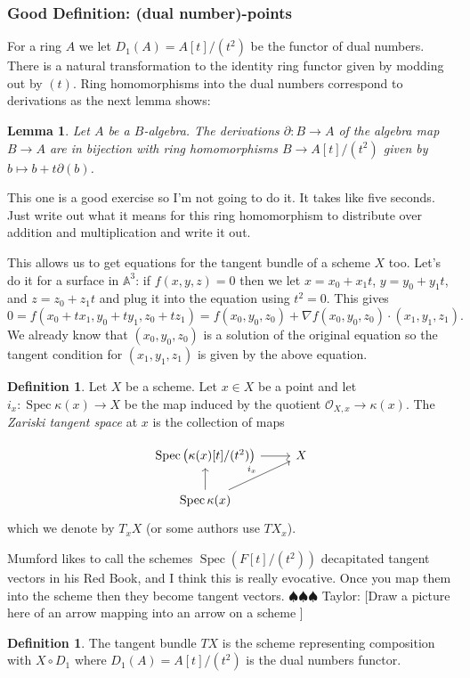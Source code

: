\documentclass[12pt]{article}
\numberwithin{equation}{section}
\newtheorem{lemma}[theorem]{Lemma}
\theoremstyle{definition}
\newtheorem{definition}[theorem]{Definition}
\theoremstyle{remark}
\newcommand{\Ocal}{\mathcal{O}}
\renewcommand{\AA}{\mathbb{A}}
\newcommand{\Spec}{\operatorname{Spec}}
\newcommand{\taylor}[1]{{\color{blue} \sf $\spadesuit\spadesuit\spadesuit$ Taylor: [#1]}}
\begin{document}
\subsubsection{Good Definition: (dual number)-points}
For a ring $A$ we let $D_1(A) = A[t]/(t^2)$ be the functor of dual numbers. 
There is a natural transformation to the identity ring functor given by modding out by $(t)$. 
Ring homomorphisms into the dual numbers correspond to derivations as the next lemma shows:
\begin{lemma}
	Let $A$ be a $B$-algebra. 
	The derivations $\partial: B \to A$ of the algebra map $B \to A$ are in bijection with ring homomorphisms $B\to A[t]/(t^2)$ given by $b\mapsto b + t\partial(b)$.  
\end{lemma}
This one is a good exercise so I'm not going to do it. 
It takes like five seconds. 
Just write out what it means for this ring homomorphism to distribute over addition and multiplication and write it out.

This allows us to get equations for the tangent bundle of a scheme $X$ too. 
Let's do it for a surface in $\AA^3$: if $f(x,y,z)=0$ then we let $x=x_0+x_1t$, $y=y_0+y_1t$, and $z=z_0+z_1 t$ and plug it into the equation using $t^2=0$. 
This gives
$$ 0=f(x_0+tx_1,y_0+ty_1,z_0+tz_1) = f(x_0,y_0,z_0) + \nabla f(x_0,y_0,z_0) \cdot (x_1,y_1,z_1).$$
We already know that $(x_0,y_0,z_0)$ is a solution of the original equation so the tangent condition for $(x_1,y_1,z_1)$ is given by the above equation.

\begin{definition}
	Let $X$ be a scheme. 
	Let $x\in X$ be a point and let $i_x: \Spec \kappa(x) \to X$ be the map induced by the quotient $\Ocal_{X,x} \to \kappa(x)$. 
	The \emph{Zariski tangent space} at $x$ is the collection of maps 
	
	$$\begin{tikzcd}
	\Spec \left( \kappa(x)[t]/(t^2) \right )  \arrow[r] & X\\
	\Spec \kappa(x) \ar[ur,"i_x"] \arrow[u] &
	\end{tikzcd}
	$$
	which we denote by $T_xX$ (or some authors use $TX_x$).
\end{definition}
Mumford likes to call the schemes $\Spec(F[t]/(t^2))$ decapitated tangent vectors in his Red Book, and I think this is really evocative. 
Once you map them into the scheme then they become tangent vectors. 
\taylor{Draw a picture here of an arrow mapping into an arrow on a scheme }

\begin{definition}
	The tangent bundle $TX$ is the scheme representing composition with $X\circ D_1$ where $D_1(A) = A[t]/(t^2)$ is the dual numbers functor.
\end{definition}
\end{document}
